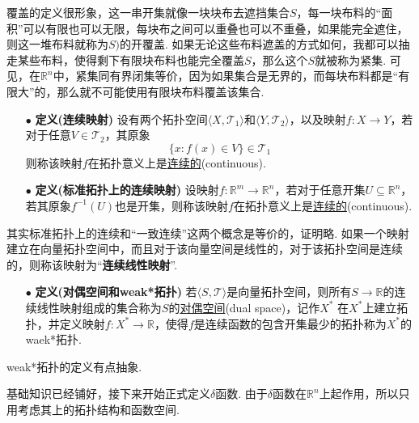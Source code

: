 \documentclass[UTF8]{ctexart}
\begin{document}
覆盖的定义很形象，这一串开集就像一块块布去遮挡集合\(S\)，每一块布料的“面积”可以有限也可以无限，每块布之间可以重叠也可以不重叠，如果能完全遮住，则这一堆布料就称为\(S)\)的开覆盖. 如果无论这些布料遮盖的方式如何，我都可以抽走某些布料，使得剩下有限块布料也能完全覆盖\(S\)，那么这个\(S\)就被称为紧集. 可见，在\(\mathbb{R}^n\)中，紧集同有界闭集等价，因为如果集合是无界的，而每块布料都是“有限大”的，那么就不可能使用有限块布料覆盖该集合.

\begin{itemize}
    \item [\(\bullet\)] \textbf{定义(连续映射)}
    \newline
    设有两个拓扑空间\(\langle X, \mathcal{T}_1 \rangle\)和\(\langle Y, \mathcal{T}_2 \rangle\)，以及映射\(f:X \to Y\)，若对于任意\(V \in \mathcal{T}_2\)，其原象
    \[\{x: f(x) \in V\} \in \mathcal{T}_1\]
    则称该映射\(f\)在拓扑意义上是\uline{连续的}(continuous).
    \item [\(\bullet\)] \textbf{定义(标准拓扑上的连续映射)}
    \newline
    设映射\(f:\mathbb{R}^m \to \mathbb{R}^n\)，若对于任意开集\(U \subseteq \mathbb{R}^n\)，若其原象\(f^{-1}(U)\)也是开集，则称该映射\(f\)在拓扑意义上是\uline{连续的}(continuous).
\end{itemize}

其实标准拓扑上的连续和“一致连续”这两个概念是等价的，证明略. 如果一个映射建立在向量拓扑空间中，而且对于该向量空间是线性的，对于该拓扑空间是连续的，则称该映射为“\textbf{连续线性映射}”. 

\begin{itemize}
    \item [\(\bullet\)] \textbf{定义(对偶空间和weak*拓扑)}
    \newline
    若\(\langle S ,\mathcal{T} \rangle\)是向量拓扑空间，则所有\(S \to \mathbb{R}\)的连续线性映射组成的集合称为\(S\)的\uline{对偶空间}(dual space)，记作\(X^*\)
    \newline
    在\(X^*\)上建立拓扑，并定义映射\(f:X^* \to \mathbb{R}\)，使得\(f\)是连续函数的包含开集最少的拓扑称为\(X^*\)的waek*拓扑.
\end{itemize}

weak*拓扑的定义有点抽象. 

\vspace{1cm}

基础知识已经铺好，接下来开始正式定义\(\delta\)函数. 由于\(\delta\)函数在\(\mathbb{R}^n\)上起作用，所以只用考虑其上的拓扑结构和函数空间.
\end{document}
